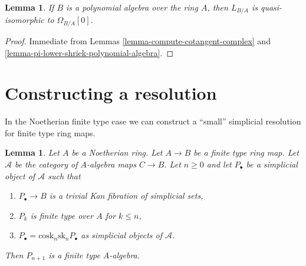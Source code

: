 \documentclass[10pt,a4paper]{article}
\theoremstyle{plain}
\newtheorem{lemma}[subsection]{Lemma}
\theoremstyle{definition}
\theoremstyle{remark}
\numberwithin{equation}{subsection}
\begin{document}
\begin{lemma}
\label{lemma-cotangent-complex-polynomial-algebra}
If $B$ is a polynomial algebra over the ring $A$, then
$L_{B/A}$ is quasi-isomorphic to $\Omega_{B/A}[0]$.
\end{lemma}

\begin{proof}
Immediate from
Lemmas \ref{lemma-compute-cotangent-complex} and
\ref{lemma-pi-lower-shriek-polynomial-algebra}.
\end{proof}





\section{Constructing a resolution}
\label{section-polynomial}

\noindent
In the Noetherian finite type case we can construct a ``small'' simplicial
resolution for finite type ring maps.

\begin{lemma}
\label{lemma-polynomial}
Let $A$ be a Noetherian ring. Let $A \to B$ be a finite type ring map.
Let $\mathcal{A}$ be the category of $A$-algebra maps $C \to B$. Let
$n \geq 0$ and let $P_\bullet$ be a simplicial object of $\mathcal{A}$
such that
\begin{enumerate}
\item $P_\bullet \to B$ is a trivial Kan fibration of simplicial sets,
\item $P_k$ is finite type over $A$ for $k \leq n$,
\item $P_\bullet = \text{cosk}_n \text{sk}_n P_\bullet$ as simplicial
objects of $\mathcal{A}$.
\end{enumerate}
Then $P_{n + 1}$ is a finite type $A$-algebra.
\end{lemma}
\end{document}
